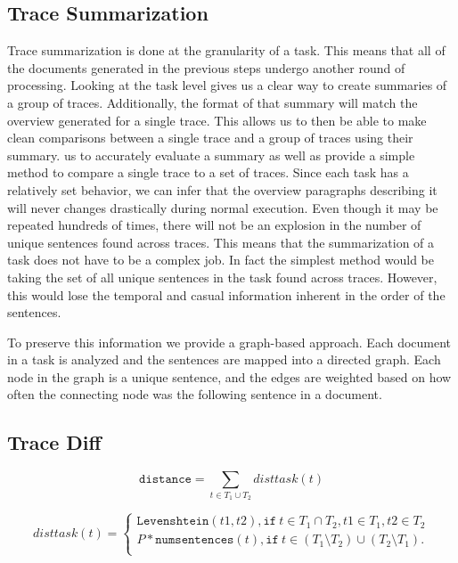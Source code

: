 \subsection{Trace Summarization}

Trace summarization is done at the granularity of a task. This means that all of the documents generated in the previous steps undergo another round of processing.
Looking at the task level gives us a clear way to create summaries of a group of traces. Additionally, the format of that summary will match the overview generated for a
single trace. This allows us to then be able to make clean comparisons between a single trace and a group of traces using their summary.
us to accurately evaluate a summary as well as provide a simple method to compare a single trace to a set of traces. Since each task has a relatively set behavior,
we can infer that the overview paragraphs describing it will never changes drastically during normal execution. Even though it may be repeated hundreds of times, 
there will not be an explosion in the number of unique sentences found across traces. This means that the 
summarization of a task does not have to be a complex job. In fact the simplest method would be taking the set of all unique sentences in the task found across
traces. However, this would lose the temporal and casual information inherent in the order of the sentences. 

To preserve this information we provide a graph-based
approach. Each document in a task is analyzed and the sentences are mapped into a directed graph. Each node in the graph is a unique sentence, and the edges are
weighted based on how often the connecting node was the following sentence in a document. 

\subsection{Trace Diff}

\begin{figure*}[tbh]
    \begin{equation}\label{eqn:disttrace}
    \texttt{distance} = \sum_{t \in T_1 \cup T_2} disttask(t)
    \end{equation}
    
    \begin{equation}\label{eqn:disttask}
        disttask(t)=
        \begin{cases}
            \texttt{Levenshtein}(t1, t2), \texttt{if}\: t \in T_1 \cap T_2, t1 \in T_1, t2 \in T_2 \\
            P * \texttt{numsentences}(t), \texttt{if}\: t \in (T_1 \setminus T_2) \cup (T_2 \setminus T_1).\\
        \end{cases}
    \end{equation}
    \end{figure*}

